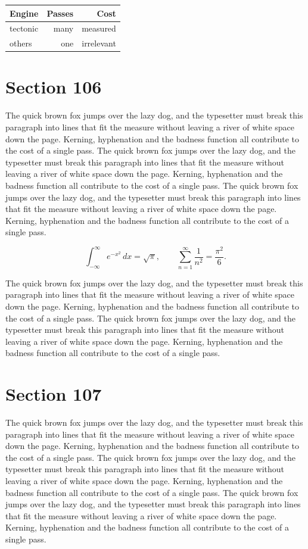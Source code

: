 \documentclass{article}
\begin{document}
\begin{center}
\begin{tabular}{lrr}
\toprule
Engine & Passes & Cost \\
\midrule
tectonic & many & measured \\
others & one & irrelevant \\
\bottomrule
\end{tabular}
\end{center}

\section{Section 106}
The quick brown fox jumps over the lazy dog, and the typesetter must break this paragraph into lines that fit the measure without leaving a river of white space down the page. Kerning, hyphenation and the badness function all contribute to the cost of a single pass. The quick brown fox jumps over the lazy dog, and the typesetter must break this paragraph into lines that fit the measure without leaving a river of white space down the page. Kerning, hyphenation and the badness function all contribute to the cost of a single pass. The quick brown fox jumps over the lazy dog, and the typesetter must break this paragraph into lines that fit the measure without leaving a river of white space down the page. Kerning, hyphenation and the badness function all contribute to the cost of a single pass. 

\begin{equation}
\int_{-\infty}^{\infty} e^{-x^{2}}\,dx = \sqrt{\pi}, \qquad
\sum_{n=1}^{\infty} \frac{1}{n^{2}} = \frac{\pi^{2}}{6}.
\end{equation}

The quick brown fox jumps over the lazy dog, and the typesetter must break this paragraph into lines that fit the measure without leaving a river of white space down the page. Kerning, hyphenation and the badness function all contribute to the cost of a single pass. The quick brown fox jumps over the lazy dog, and the typesetter must break this paragraph into lines that fit the measure without leaving a river of white space down the page. Kerning, hyphenation and the badness function all contribute to the cost of a single pass. 
\section{Section 107}
The quick brown fox jumps over the lazy dog, and the typesetter must break this paragraph into lines that fit the measure without leaving a river of white space down the page. Kerning, hyphenation and the badness function all contribute to the cost of a single pass. The quick brown fox jumps over the lazy dog, and the typesetter must break this paragraph into lines that fit the measure without leaving a river of white space down the page. Kerning, hyphenation and the badness function all contribute to the cost of a single pass. The quick brown fox jumps over the lazy dog, and the typesetter must break this paragraph into lines that fit the measure without leaving a river of white space down the page. Kerning, hyphenation and the badness function all contribute to the cost of a single pass. 
\end{document}
